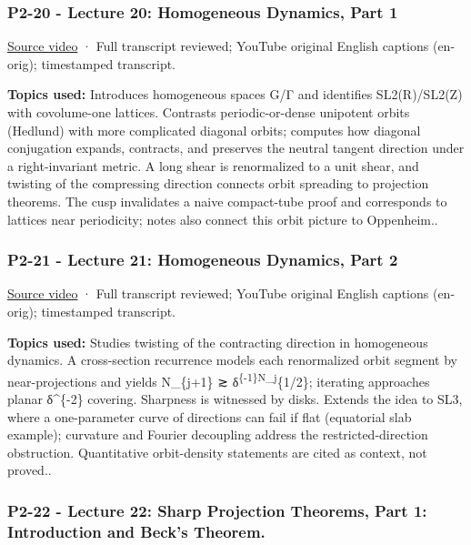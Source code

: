 \subsubsection{P2-20 - Lecture 20: Homogeneous Dynamics, Part 1}\label{04-visual-computing-ii-ch036-p2-20---lecture-20-homogeneous-dynamics-part-1}

\href{https://www.youtube.com/watch?v=rChKr66KG-c}{Source video} · Full transcript reviewed; YouTube original English captions (en-orig); timestamped transcript.

\textbf{Topics used:} Introduces homogeneous spaces G/Γ and identifies SL2(R)/SL2(Z) with covolume-one lattices. Contrasts periodic-or-dense unipotent orbits (Hedlund) with more complicated diagonal orbits; computes how diagonal conjugation expands, contracts, and preserves the neutral tangent direction under a right-invariant metric. A long shear is renormalized to a unit shear, and twisting of the compressing direction connects orbit spreading to projection theorems. The cusp invalidates a naive compact-tube proof and corresponds to lattices near periodicity; notes also connect this orbit picture to Oppenheim..

\subsubsection{P2-21 - Lecture 21: Homogeneous Dynamics, Part 2}\label{04-visual-computing-ii-ch036-p2-21---lecture-21-homogeneous-dynamics-part-2}

\href{https://www.youtube.com/watch?v=5QV8Gr1z16E}{Source video} · Full transcript reviewed; YouTube original English captions (en-orig); timestamped transcript.

\textbf{Topics used:} Studies twisting of the contracting direction in homogeneous dynamics. A cross-section recurrence models each renormalized orbit segment by near-projections and yields N\_\{j+1\} ≳ δ\textsuperscript{\{-1\}N\_j}\{1/2\}; iterating approaches planar δ\^{}\{-2\} covering. Sharpness is witnessed by disks. Extends the idea to SL3, where a one-parameter curve of directions can fail if flat (equatorial slab example); curvature and Fourier decoupling address the restricted-direction obstruction. Quantitative orbit-density statements are cited as context, not proved..

\subsubsection{P2-22 - Lecture 22: Sharp Projection Theorems, Part 1: Introduction and Beck's Theorem.}\label{04-visual-computing-ii-ch036-p2-22---lecture-22-sharp-projection-theorems-part-1-introduction-and-becks-theorem.}

